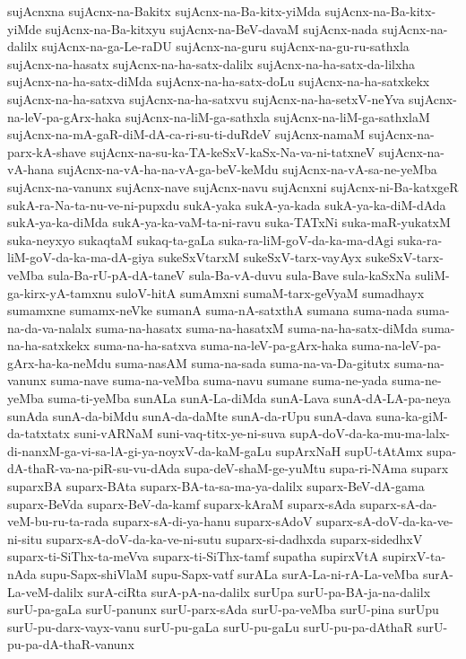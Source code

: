{sujAcnxna
sujAcnx-na-Bakitx
sujAcnx-na-Ba-kitx-yiMda
sujAcnx-na-Ba-kitx-yiMde
sujAcnx-na-Ba-kitxyu
sujAcnx-na-BeV-davaM
sujAcnx-nada
sujAcnx-na-dalilx
sujAcnx-na-ga-Le-raDU
sujAcnx-na-guru
sujAcnx-na-gu-ru-sathxla
sujAcnx-na-hasatx
sujAcnx-na-ha-satx-dalilx
sujAcnx-na-ha-satx-da-lilxha
sujAcnx-na-ha-satx-diMda
sujAcnx-na-ha-satx-doLu
sujAcnx-na-ha-satxkekx
sujAcnx-na-ha-satxva
sujAcnx-na-ha-satxvu
sujAcnx-na-ha-setxV-neYva
sujAcnx-na-leV-pa-gArx-haka
sujAcnx-na-liM-ga-sathxla
sujAcnx-na-liM-ga-sathxlaM
sujAcnx-na-mA-gaR-diM-dA-ca-ri-su-ti-duRdeV
sujAcnx-namaM
sujAcnx-na-parx-kA-shave
sujAcnx-na-su-ka-TA-keSxV-kaSx-Na-va-ni-tatxneV
sujAcnx-na-vA-hana
sujAcnx-na-vA-ha-na-vA-ga-beV-keMdu
sujAcnx-na-vA-sa-ne-yeMba
sujAcnx-na-vanunx
sujAcnx-nave
sujAcnx-navu
sujAcnxni
sujAcnx-ni-Ba-katxgeR
sukA-ra-Na-ta-nu-ve-ni-pupxdu
sukA-yaka
sukA-ya-kada
sukA-ya-ka-diM-dAda
sukA-ya-ka-diMda
sukA-ya-ka-vaM-ta-ni-ravu
suka-TATxNi
suka-maR-yukatxM
suka-neyxyo
sukaqtaM
sukaq-ta-gaLa
suka-ra-liM-goV-da-ka-ma-dAgi
suka-ra-liM-goV-da-ka-ma-dA-giya
sukeSxVtarxM
sukeSxV-tarx-vayAyx
sukeSxV-tarx-veMba
sula-Ba-rU-pA-dA-taneV
sula-Ba-vA-duvu
sula-Bave
sula-kaSxNa
suliM-ga-kirx-yA-tamxnu
suloV-hitA
sumAmxni
sumaM-tarx-geVyaM
sumadhayx
sumamxne
sumamx-neVke
sumanA
suma-nA-satxthA
sumana
suma-nada
suma-na-da-va-nalalx
suma-na-hasatx
suma-na-hasatxM
suma-na-ha-satx-diMda
suma-na-ha-satxkekx
suma-na-ha-satxva
suma-na-leV-pa-gArx-haka
suma-na-leV-pa-gArx-ha-ka-neMdu
suma-nasAM
suma-na-sada
suma-na-va-Da-gitutx
suma-na-vanunx
suma-nave
suma-na-veMba
suma-navu
sumane
suma-ne-yada
suma-ne-yeMba
suma-ti-yeMba
sunALa
sunA-La-diMda
sunA-Lava
sunA-dA-LA-pa-neya
sunAda
sunA-da-biMdu
sunA-da-daMte
sunA-da-rUpu
sunA-dava
suna-ka-giM-da-tatxtatx
suni-vARNaM
suni-vaq-titx-ye-ni-suva
supA-doV-da-ka-mu-ma-lalx-di-nanxM-ga-vi-sa-lA-gi-ya-noyxV-da-kaM-gaLu
supArxNaH
supU-tAtAmx
supa-dA-thaR-va-na-piR-su-vu-dAda
supa-deV-shaM-ge-yuMtu
supa-ri-NAma
suparx
suparxBA
suparx-BAta
suparx-BA-ta-sa-ma-ya-dalilx
suparx-BeV-dA-gama
suparx-BeVda
suparx-BeV-da-kamf
suparx-kAraM
suparx-sAda
suparx-sA-da-veM-bu-ru-ta-rada
suparx-sA-di-ya-hanu
suparx-sAdoV
suparx-sA-doV-da-ka-ve-ni-situ
suparx-sA-doV-da-ka-ve-ni-sutu
suparx-si-dadhxda
suparx-sidedhxV
suparx-ti-SiThx-ta-meVva
suparx-ti-SiThx-tamf
supatha
supirxVtA
supirxV-ta-nAda
supu-Sapx-shiVlaM
supu-Sapx-vatf
surALa
surA-La-ni-rA-La-veMba
surA-La-veM-dalilx
surA-ciRta
surA-pA-na-dalilx
surUpa
surU-pa-BA-ja-na-dalilx
surU-pa-gaLa
surU-panunx
surU-parx-sAda
surU-pa-veMba
surU-pina
surUpu
surU-pu-darx-vayx-vanu
surU-pu-gaLa
surU-pu-gaLu
surU-pu-pa-dAthaR
surU-pu-pa-dA-thaR-vanunx
}
